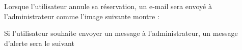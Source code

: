 \documentclass{article}
\begin{document}
\begin{enumerate}
  \vspace{0.7cm}
               \hspace*{-0.7in}
               \noindent{}
  
  
Lorsque l'utilisateur annule sa réservation, un e-mail sera envoyé à l'administrateur comme l'image suivante montre :  
  
	\vspace{0.7cm}
               \hspace*{-0.7in}
               \noindent{}  
  
  
  Si l'utilisateur souhaite envoyer un message à l'administrateur, un message d'alerte sera le suivant
  

\end{enumerate}
\end{document}
